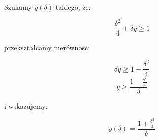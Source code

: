 \documentclass{article}
\begin{document}
Szukamy \(y(\delta)\) takiego, że:

\begin{equation*}
    \frac{\delta^{2}}{4} + \delta y \geq 1
\end{equation*}

przekształcamy nierówność:

\begin{equation*}
    \delta y \geq 1 - \frac{\delta^{2}}{4}
\end{equation*}
\begin{equation*}
    y \geq \frac{1 - \frac{\delta^{2}}{4}}{\delta}
\end{equation*}

i wskazujemy:

\begin{equation*}
    y(\delta) = \frac{1 + \frac{\delta^{2}}{4}}{\delta}
\end{equation*}
\end{document}
